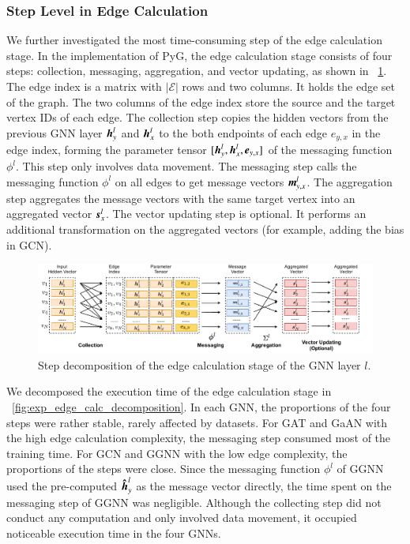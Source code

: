 \subsubsection{Step Level in Edge Calculation}

We further investigated the most time-consuming step of the edge calculation stage.
%
In the implementation of PyG, the edge calculation stage consists of four steps: collection, messaging, aggregation, and vector updating, as shown in \figurename~\ref{fig:steps_in_edge_calculation}.
%
The edge index is a matrix with $|\mathcal{E}|$ rows and two columns.
%
It holds the edge set of the graph.
%
The two columns of the edge index store the source and the target vertex IDs of each edge.
%
The collection step copies the hidden vectors from the previous GNN layer $\boldsymbol{h}^l_y$ and $\boldsymbol{h}^l_x$ to the both endpoints of each edge $e_{y,x}$ in the edge index, forming the parameter tensor $[\boldsymbol{h}^l_{y}, \boldsymbol{h}^l_{x}, \boldsymbol{e}_{y,x}]$ of the messaging function $\phi^l$.
%
This step only involves data movement.
%
The messaging step calls the messaging function $\phi^l$ on all edges to get message vectors $\boldsymbol{m}^l_{y,x}$.
%
The aggregation step aggregates the message vectors with the same target vertex into an aggregated vector $\boldsymbol{s}^l_x$.
%
The vector updating step is optional.
%
It performs an additional transformation on the aggregated vectors (for example, adding the bias in GCN).

\begin{figure}[H]
    \centering
    \includegraphics[width=1\columnwidth]{figs/illustration/steps_in_edge_calculation.pdf}
    \caption{Step decomposition of the edge calculation stage of the GNN layer $l$.}
    \label{fig:steps_in_edge_calculation}
\end{figure}

We decomposed the execution time of the edge calculation stage in \figurename~\ref{fig:exp_edge_calc_decomposition}.
%
In each GNN, the proportions of the four steps were rather stable, rarely affected by datasets. 
%
For GAT and GaAN with the high edge calculation complexity, the messaging step consumed most of the training time. 
%
For GCN and GGNN with the low edge complexity, the proportions of the steps were close. 
%
Since the messaging function $\phi^l$ of GGNN used the pre-computed $\boldsymbol{\hat{h}}^l_y$ as the message vector directly, the time spent on the messaging step of GGNN was negligible.
%
Although the collecting step did not conduct any computation and only involved data movement, it occupied noticeable execution time in the four GNNs.

